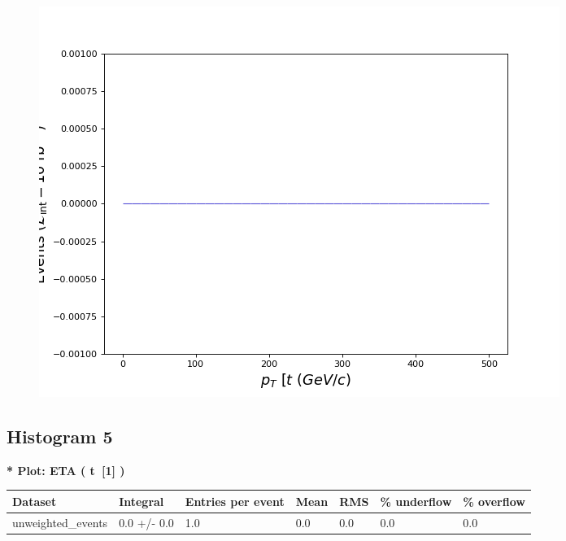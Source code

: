 \documentclass[a4paper, 10pt]{article}
\begin{document}
\begin{figure}[H]
  \begin{center}
    \includegraphics[scale=0.45]{selection_3.png}\\
\caption{   }
  \end{center}
\end{figure}
      \newpage
\subsection{ Histogram 5}

\textbf{* Plot: ETA ( t~[1] ) }\\
   \begin{table}[H]
  \begin{center}
    \begin{tabular}{|m{23.0mm}|m{23.0mm}|m{18.0mm}|m{19.0mm}|m{19.0mm}|m{19.0mm}|m{19.0mm}|}
      \hline
      {\cellcolor{yellow}         Dataset}& {\cellcolor{yellow}         Integral}& {\cellcolor{yellow}         Entries per event}& {\cellcolor{yellow}         Mean}& {\cellcolor{yellow}         RMS}& {\cellcolor{yellow}         \% underflow}& {\cellcolor{yellow}         \% overflow}\\
      \hline
      {\cellcolor{white}         unweighted\_events}& {\cellcolor{white}         0.0 +/\-- 0.0}& {\cellcolor{white}         1.0}& {\cellcolor{white}         0.0}& {\cellcolor{white}         0.0}& {\cellcolor{green}         0.0}& {\cellcolor{green}         0.0}\\
\hline
    \end{tabular}
  \end{center}
\end{table}
\end{document}

